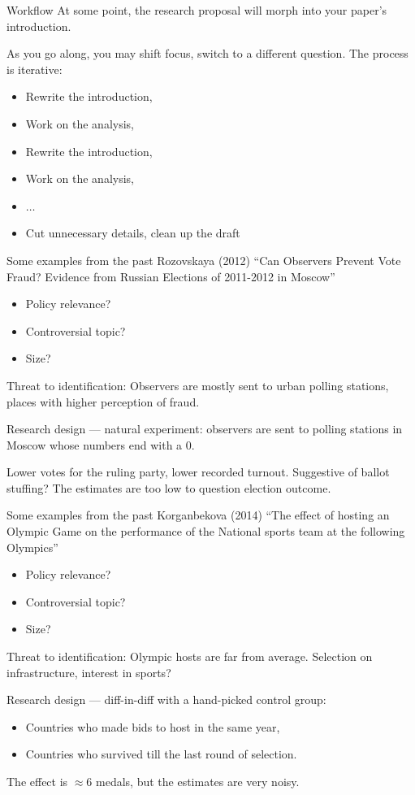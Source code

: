 \documentclass[notes=show,beamer,compress]{beamer}
\begin{document}
\begin{frame}{Workflow}
	At some point, the research proposal will morph into your paper's introduction.
	\bigskip
	
	As you go along, you may shift focus, switch to a different question. The process is iterative:
	\begin{itemize}
		\item Rewrite the introduction,
		\item Work on the analysis,
		\item Rewrite the introduction,
		\item Work on the analysis,
		\item $\dots$
		\item Cut unnecessary details, clean up the draft
	\end{itemize}
\end{frame}

\begin{frame}{Some examples from the past}
	Rozovskaya (2012) ``Can Observers Prevent Vote Fraud? Evidence from Russian Elections of 2011-2012
	in Moscow''
	
	\begin{itemize}
		\item Policy relevance?
		\item Controversial topic?
		\item Size?
	\end{itemize}
	Threat to identification: Observers are mostly sent to urban polling stations, places with higher perception of fraud.
	
	Research design --- natural experiment: observers are sent to polling stations in Moscow whose numbers end with a 0.
	
	\bigskip
	Lower votes for the ruling party, lower recorded turnout. Suggestive of ballot stuffing? The estimates are too low to question election outcome.

\end{frame}

\begin{frame}{Some examples from the past}
	Korganbekova (2014) ``The effect of hosting an Olympic Game on the performance of the National sports team at the following Olympics''
	
	\begin{itemize}
		\item Policy relevance?
		\item Controversial topic?
		\item Size?
	\end{itemize}
	Threat to identification: Olympic hosts are far from average. Selection on infrastructure, interest in sports?
	
	Research design --- diff-in-diff with a hand-picked control group:
	\begin{itemize}
		\item Countries who made bids to host in the same year,
		\item Countries who survived till the last round of selection.
	\end{itemize}
	The effect is $\approx 6$ medals, but the estimates are very noisy.
	
\end{frame}
\end{document}
